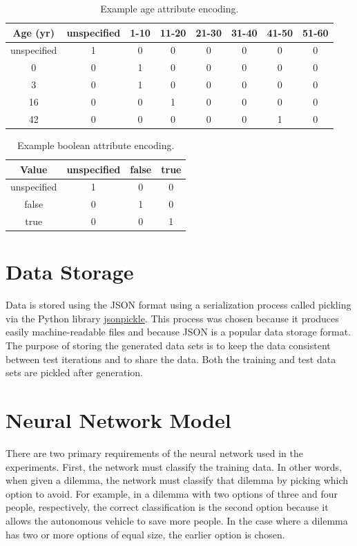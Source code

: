 \documentclass{report}
\begin{document}
\begin{table}[h]
    \centering
    \begin{tabular}{c|c|c|c|c|c|c|c}
        Age (yr) & unspecified & 1-10 & 11-20 & 21-30 & 31-40 & 41-50 & 51-60 \\\hline
        unspecified & 1 & 0 & 0 & 0 & 0 & 0 & 0 \\
        0 & 0 & 1 & 0 & 0 & 0 & 0 & 0 \\
        3 & 0 & 1 & 0 & 0 & 0 & 0 & 0 \\
        16 & 0 & 0 & 1 & 0 & 0 & 0 & 0 \\
        42 & 0 & 0 & 0 & 0 & 0 & 1 & 0
    \end{tabular}
    \caption{Example age attribute encoding.}
    \label{tab:example_age_attribute_encoding}
\end{table}

\begin{table}[h]
    \centering
    \begin{tabular}{c|c|c|c}
        Value & unspecified & false & true \\\hline
        unspecified & 1 & 0 & 0 \\
        false & 0 & 1 & 0 \\
        true & 0 & 0 & 1
    \end{tabular}
    \caption{Example boolean attribute encoding.}
    \label{tab:example_boolean_attribute_encoding}
\end{table}

\FloatBarrier
\section{Data Storage}

Data is stored using the JSON format using a serialization process called pickling via the Python
library \href{https://jsonpickle.github.io/}{jsonpickle}. This process was chosen because it
produces easily machine-readable files and because JSON is a popular data storage format. The
purpose of storing the generated data sets is to keep the data consistent between test iterations
and to share the data. Both the training and test data sets are pickled after generation.

\FloatBarrier
\section{Neural Network Model}

There are two primary requirements of the neural network used in the experiments. First, the network
must classify the training data. In other words, when given a dilemma, the network must classify
that dilemma by picking which option to avoid. For example, in a dilemma with two options of three
and four people, respectively, the correct classification is the second option because it allows the
autonomous vehicle to save more people. In the case where a dilemma has two or more options of equal
size, the earlier option is chosen.
\end{document}
